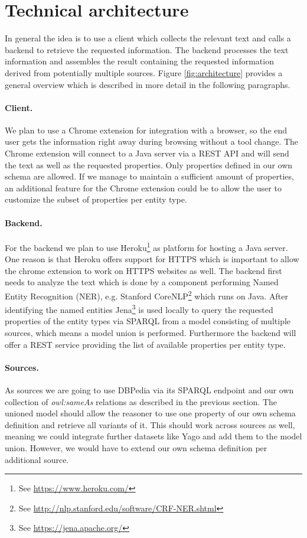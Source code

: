 \documentclass[11pt,titlepage,oneside,openany]{article}
\begin{document}
\section{Technical architecture}
In general the idea is to use a client which collects the relevant text and
calls a backend to retrieve the requested information. The backend processes the
text information and assembles the result containing the requested information
derived from potentially multiple sources. Figure \ref{fig:architecture}
provides a general overview which is described in more detail in the following
paragraphs.

\paragraph{Client.}
We plan to use a Chrome extension for integration with a browser, so the
end user gets the information right away during browsing without a tool change.
The Chrome extension will connect to a Java server via a REST API and will send
the text as well as the requested properties. Only properties defined in our own
schema are allowed. If we manage to maintain a sufficient amount of properties,
an additional feature for the Chrome extension could be to allow the user to
customize the subset of properties per entity type.

\paragraph{Backend.}
For the backend we plan to use Heroku\footnote{See
\url{https://www.heroku.com/}} as platform for hosting a Java server. One reason
is that Heroku offers support for HTTPS which is important to allow the chrome
extension to work on HTTPS websites as well. 
The backend first needs to analyze the text which is done by a component
performing Named Entity Recognition (NER), e.g. Stanford CoreNLP\footnote{See
\url{http://nlp.stanford.edu/software/CRF-NER.shtml}} which runs on Java. After
identifying the named entities Jena\footnote{See \url{https://jena.apache.org/}}
is used locally to query the requested properties of the entity types via SPARQL
from a model consisting of multiple sources, which means a model union is
performed.
Furthermore the backend will offer a REST service providing the list of
available properties per entity type.

\paragraph{Sources.}
As sources we are going to use DBPedia via its SPARQL endpoint and our own
collection of \textit{owl:sameAs} relations as described in the previous
section. The unioned model should allow the reasoner to use one property of
our own schema definition and retrieve all variants of it. This should work
across sources as well, meaning we could integrate further datasets like Yago
and add them to the model union. However, we would have to extend our own schema
definition per additional source. 
\end{document}
